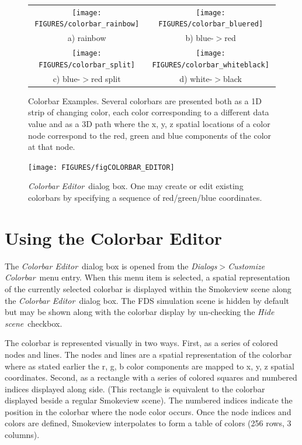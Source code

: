 \documentclass[11pt,twoside]{book}
\begin{document}
\begin{figure}[\figoptions]
\begin{center}
\begin{tabular}{cc}
\texttt{[image: FIGURES/colorbar\_rainbow]}&
\texttt{[image: FIGURES/colorbar\_bluered]}\\
a) rainbow&b) blue-$>$red\\
\texttt{[image: FIGURES/colorbar\_split]}&
\texttt{[image: FIGURES/colorbar\_whiteblack]}\\
c) blue-$>$red split&d) white-$>$black
\end{tabular}
\end{center}
\caption[Colorbar Examples]{
Colorbar Examples.  Several colorbars are presented both as a 1D strip
of changing color, each color corresponding to a different
data value and as a 3D path where the x, y, z spatial locations
of a color node correspond to the red, green and blue components
of the color at that node.} \label{figCOLORBAR_EXAMPLES}
\end{figure}

\begin{figure}[\figoptions]
\begin{center}
\texttt{[image: FIGURES/figCOLORBAR\_EDITOR]}
\end{center}
\caption[{\em Colorbar Editor}\ dialog box.]{ {\em Colorbar
Editor}\ dialog box. One may create or edit existing colorbars by specifying a sequence of red/green/blue coordinates.  } \label{figCOLORBAR}
\end{figure}

\section{Using the Colorbar Editor}
\label{section:colorbar}
The {\em Colorbar Editor}\ dialog box is opened from the {\em
Dialogs$>$Customize Colorbar}\ menu entry. When this menu item is
selected, a spatial representation of the currently selected
colorbar is displayed within the Smokeview scene along the {\em
Colorbar Editor}\ dialog box.  The FDS simulation scene is hidden
by default but may be shown along with the colorbar display by
un-checking the {\em Hide scene}\ checkbox.

The colorbar is represented visually in two ways.  First, as a series
of colored nodes and lines.
The nodes and lines are a spatial representation of the colorbar where as
stated earlier the r, g, b color components are mapped to x, y, z spatial
coordinates.
Second, as a rectangle with a series of colored squares and numbered
indices
displayed along side. (This rectangle is equivalent to the colorbar
displayed beside a regular Smokeview scene).  The numbered indices indicate
the position in the colorbar where the node color occurs.
Once the node indices and colors are defined, Smokeview interpolates to
form a table of colors (256 rows, 3 columns).
\end{document}
